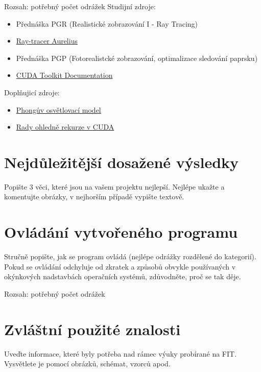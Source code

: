 \documentclass[11pt,a4paper]{article}
\begin{document}
Rozsah: potřebný počet odrážek
Studijní zdroje:
\begin{itemize}
\item Přednáška PGR (Realistické zobrazování I - Ray Tracing)
\item \href{https://www.fit.vutbr.cz/study/courses/PGR/private/Aurelius.zip}{Ray-tracer Aurelius}
\item Přednáška PGP (Fotorealistcké zobrazování, optimalizace sledování paprsku)
\item \href{http://docs.nvidia.com/cuda}{CUDA Toolkit Documentation}
\end{itemize}
Doplňujicí zdroje:
\begin{itemize}
\item \href{http://cs.wikipedia.org/wiki/Phong%C5%AFv_osv%C4%9Btlovac%C3%AD_model}{Phongův osvětlovací model}
\item \href{http://stackoverflow.com/questions/19013156/how-does-cuda-4-0-support-recursion}{Rady ohledně rekurze v CUDA}
\end{itemize}
\section{Nejdůležitější dosažené výsledky}

Popište 3 věci, které jsou na vašem projektu nejlepší. Nejlépe ukažte a
komentujte obrázky, v nejhorším případě vypište textově.

\section{Ovládání vytvořeného programu}

Stručně popište, jak se program ovládá (nejlépe odrážky rozdělené do
kategorií). Pokud se ovládání odchyluje od zkratek a způsobů obvykle
používaných v okýnkových nadstavbách operačních systémů, zdůvodněte, proč se
tak děje.

Rozsah: potřebný počet odrážek

\section{Zvláštní použité znalosti}

Uveďte informace, které byly potřeba nad rámec výuky probírané na FIT.
Vysvětlete je pomocí obrázků, schémat, vzorců apod. 
\end{document}
